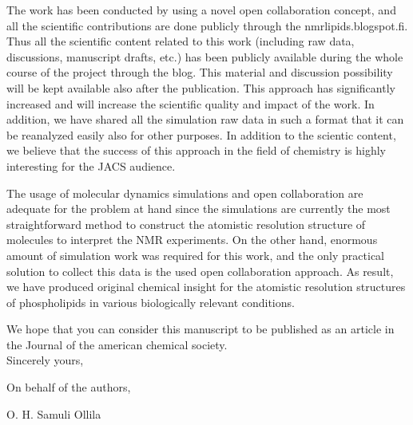 \documentclass[12pt]{letter}
\begin{document}
The work has been conducted by using a novel open collaboration concept, and all the scientific contributions
are done publicly through the nmrlipids.blogspot.fi. Thus all the scientific content related to this work
(including raw data, discussions, manuscript drafts, etc.)
has been publicly available during the whole course of the project through the blog. This material and discussion possibility
will be kept available also after the publication. This approach has significantly increased and will increase the scientific
quality and impact of the work. In addition, we have shared all the simulation raw data in such a format
that it can be reanalyzed easily also for other purposes. In addition to the scientic content,
we believe that the success of this approach in the field of chemistry is highly interesting 
for the JACS audience.

The usage of molecular dynamics simulations and open collaboration are adequate for the
problem at hand since the simulations are currently the most straightforward method to 
construct the atomistic resolution structure of molecules to interpret the NMR experiments. On the other hand,
enormous amount of simulation work was required for this work, and the only practical
solution to collect this data is the used open collaboration approach.
As result, we have produced original chemical insight for the atomistic resolution 
structures of phospholipids in various biologically relevant conditions.

We hope that you can consider this manuscript to be published as an article in the Journal of the american chemical society. \\




Sincerely yours,

On behalf of the authors,

O. H. Samuli Ollila
\end{document}
